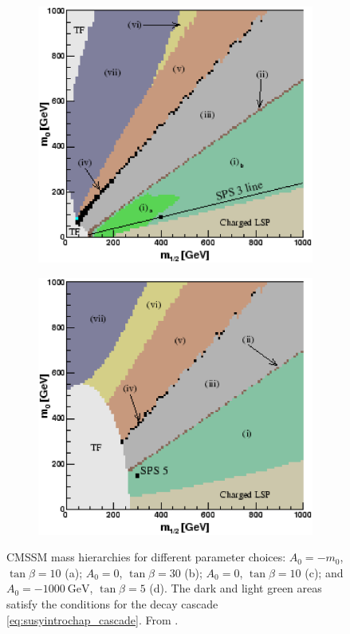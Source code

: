 \documentclass[twoside,english]{uiofysmaster}
\begin{document}
\begin{figure}[hbt]
\begin{subfigure}[b]{0.4\textwidth}
	\includegraphics[width=1\textwidth]{figures/susyintro/scan_sps3.eps}
	\caption{ }
	\label{fig:mSUGRA_decay_spectrum_c}
\end{subfigure}
\begin{subfigure}[b]{0.4\textwidth}
	\includegraphics[width=1\textwidth]{figures/susyintro/scan_sps5.eps}
	\caption{ }
	\label{fig:mSUGRA_decay_spectrum_d}
\end{subfigure}
\caption{CMSSM mass hierarchies for different parameter choices: $A_0 = -m_0$, $\tan\beta = 10$ (a); $A_0 = 0$, $\tan\beta = 30$ (b); $A_0 = 0$, $\tan\beta = 10$ (c); and $A_0 = -1000~\mathrm{GeV}$, $\tan\beta = 5$ (d). The dark and light green areas satisfy the conditions for the decay cascade \eqref{eq:susyintrochap_cascade}. From \cite{Gjelsten:2004ki}.}
\label{fig:mSUGRA_decay_spectrum}
\end{figure}
\end{document}
